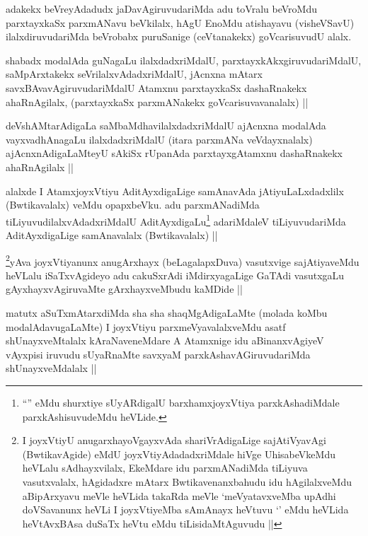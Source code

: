 \begin{artha}
adakekx beVreyAdadudx jaDavAgiruvudariMda adu toVralu beVroMdu parxtayxkaSx parxmANavu beVkilalx, hAgU EnoMdu atishayavu (visheVSavU) ilalxdiruvudariMda beVrobabx puruSanige (ceVtanakekx) goVcarisuvudU alalx.
\end{artha}

\begin{artha}
shabadx modalAda guNagaLu ilalxdadxriMdalU, parxtayxkAkxgiruvudariMdalU, saMpArxtakekx seVrilalxvAdadxriMdalU, jAcnxna mAtarx savxBAvavAgiruvudariMdalU Atamxnu parxtayxkaSx dashaRnakekx ahaRnAgilalx, (parxtayxkaSx parxmANakekx goVcarisuvavanalalx) ||
\end{artha}

\begin{artha}
deVshAMtarAdigaLa saMbaMdhavilalxdadxriMdalU ajAcnxna modalAda vayxvadhAnagaLu ilalxdadxriMdalU (itara parxmANa veVdayxnalalx) ajAcnxnAdigaLaMteyU sAkiSx rUpanAda parxtayxgAtamxnu dashaRnakekx ahaRnAgilalx ||
\end{artha}

\begin{artha}
alalxde I AtamxjoyxVtiyu AditAyxdigaLige samAnavAda jAtiyuLaLxdadxlilx (Bwtikavalalx) veMdu opapxbeVku. adu parxmANadiMda tiLiyuvudilalxvAdadxriMdalU AditAyxdigaLu\footnote[1]{``\stext'' eMdu shurxtiye sUyARdigalU barxhamxjoyxVtiya parxkAshadiMdale parxkAshisuvudeMdu heVLide.} adariMdaleV tiLiyuvudariMda AditAyxdigaLige samAnavalalx (Bwtikavalalx) ||
\end{artha}

\begin{artha}
\footnote[2]{I joyxVtiyU anugarxhayoVgayxvAda shariVrAdigaLige sajAtiVyavAgi (BwtikavAgide) eMdU joyxVtiyAdadadxriMdale hiVge UhisabeVkeMdu heVLalu sAdhayxvilalx, EkeMdare idu parxmANadiMda tiLiyuva vasutxvalalx, hAgidadxre mAtarx Bwtikavenanxbahudu idu hAgilalxveMdu aBipArxyavu meVle heVLida takaRda meVle `meVyatavxveMba upAdhi doVSavanunx heVLi I joyxVtiyeMba sAmAnayx heVtuvu `\stext' eMdu heVLida heVtAvxBAsa duSaTx heVtu eMdu tiLisidaMtAguvudu ||}yAva joyxVtiyanunx anugArxhayx (beLagalapxDuva) vasutxvige sajAtiyaveMdu heVLalu iSaTxvAgideyo adu cakuSxrAdi iMdirxyagaLige GaTAdi vasutxgaLu gAyxhayxvAgiruvaMte gArxhayxveMbudu kaMDide ||
\end{artha}

\begin{artha}
matutx aSuTxmAtarxdiMda sha sha shaqMgAdigaLaMte (molada koMbu modalAdavugaLaMte) I joyxVtiyu parxmeVyavalalxveMdu asatf shUnayxveMtalalx kAraNaveneMdare A Atamxnige idu aBinanxvAgiyeV vAyxpisi iruvudu sUyaRnaMte savxyaM parxkAshavAGiruvudariMda shUnayxveMdalalx ||
\end{artha}

